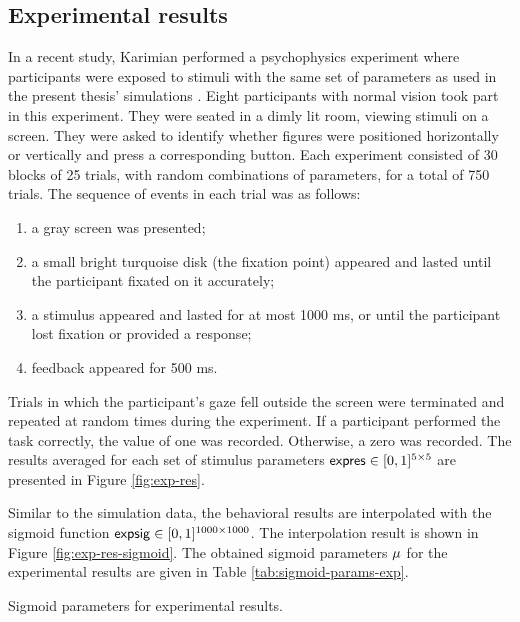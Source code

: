 \subsection{Experimental results}

In a recent study, Karimian performed a psychophysics experiment where participants were exposed to stimuli with the same set of parameters as used in the present thesis' simulations \cite{MaryamPLACEHOLDER}.
Eight participants with normal vision took part in this experiment. They were seated in a dimly lit room, viewing stimuli on a screen. They were asked to identify whether figures were positioned horizontally or vertically and press a corresponding button. Each experiment consisted of 30 blocks of 25 trials, with random combinations of parameters, for a total of 750 trials. The sequence of events in each trial was as follows: 
\begin{enumerate}
    \item a gray screen was presented;
    \item a small bright turquoise disk (the fixation point) appeared and lasted until the participant fixated on it accurately;
    \item a stimulus appeared and lasted for at most 1000 ms, or until the participant lost fixation or provided a response;
    \item feedback appeared for 500 ms.
\end{enumerate}
Trials in which the participant's gaze fell outside the screen were terminated and repeated at random times during the experiment. If a participant performed the task correctly, the value of one was recorded. Otherwise, a zero was recorded.
The results averaged for each set of stimulus parameters $\mathsf{expres} \in [0, 1]^{5 \times 5}$ are presented in Figure \ref{fig:exp-res}. 

Similar to the simulation data, 
the behavioral results are interpolated with the sigmoid function $\mathsf{expsig} \in [0, 1]^{1000 \times 1000}$. The interpolation result is shown in Figure \ref{fig:exp-res-sigmoid}. The obtained sigmoid parameters $\mu$ for the experimental results are given in Table \ref{tab:sigmoid-params-exp}.

\begin{table}[!htp]
    \centering
    
    \caption[Sigmoid parameters for experimental results]{Sigmoid parameters for experimental results.}
    \label{tab:sigmoid-params-exp}
\end{table}

